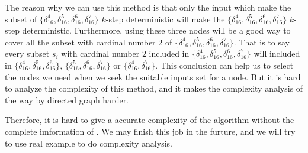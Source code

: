 The reason why we can use this method is that only the input which make the subset of $\{\delta_{16}^4,\delta_{16}^5,\delta_{16}^6,\delta_{16}^7\}$ $k$-step deterministic will make the $\{\delta_{16}^4,\delta_{16}^5,\delta_{16}^6,\delta_{16}^7\}$ $k$-step deterministic. Furthermore, using these three nodes will be a good way to cover all the subset with cardinal number $2$ of $\{\delta_{16}^4,\delta_{16}^5,\delta_{16}^6,\delta_{16}^7\}$. That is to say every subset $s_i$ with cardinal number $2$ included in $\{\delta_{16}^4,\delta_{16}^5,\delta_{16}^6,\delta_{16}^7\}$ will included in $\{\delta_{16}^4,\delta_{16}^5,\delta_{16}^6\}$, $\{\delta_{16}^5,\delta_{16}^6,\delta_{16}^7\}$ or $\{\delta_{16}^4,\delta_{16}^7\}$. This conclusion can help us to select the nodes we need when we seek the suitable inputs set for a node. But it is hard to analyze the complexity of this method, and it makes the complexity analysis of the way by directed graph harder.

Therefore, it is hard to give a accurate complexity of the algorithm without the complete imformation of \BCNs. We may finish this job in the furture, and we will try to use real example to do complexity analysis.
